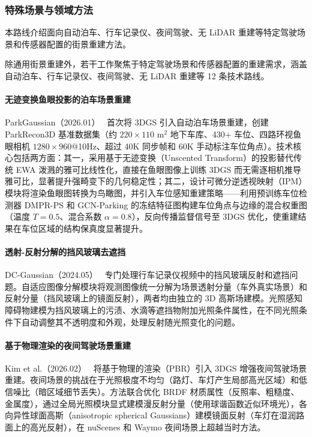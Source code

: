 \subsubsection{特殊场景与领域方法}

本路线介绍面向自动泊车、行车记录仪、夜间驾驶、无 LiDAR 重建等特定驾驶场景和传感器配置的街景重建方法。

除通用街景重建外，若干工作聚焦于特定驾驶场景和传感器配置的重建需求，涵盖自动泊车、行车记录仪、夜间驾驶、无 LiDAR 重建等 12 条技术路线。

\paragraph{无迹变换鱼眼投影的泊车场景重建}

ParkGaussian（2026.01）~\cite{2601_01386} 首次将 3DGS 引入自动泊车场景重建，创建 ParkRecon3D 基准数据集（约 $220\times110$ m$^2$ 地下车库、430+ 车位、四路环视鱼眼相机 $1280\times960$@10Hz、超过 40K 同步帧和 60K 手动标注车位角点）。技术核心包括两方面：其一，采用基于无迹变换（Unscented Transform）的投影替代传统 EWA 泼溅的雅可比线性化，直接在鱼眼图像上训练 3DGS 而无需逐相机推导雅可比，显著提升强畸变下的几何稳定性；其二，设计可微分逆透视映射（IPM）模块将渲染鱼眼图转换为鸟瞰图，并引入车位感知重建策略——利用预训练车位检测器 DMPR-PS 和 GCN-Parking 的冻结特征图构建车位角点与边缘的混合权重图（温度 $T=0.5$、混合系数 $\alpha=0.8$），反向传播监督信号至 3DGS 优化，使重建结果在车位区域的结构保真度显著提升。

\paragraph{透射-反射分解的挡风玻璃去遮挡}

DC-Gaussian（2024.05）~\cite{2405_17705} 专门处理行车记录仪视频中的挡风玻璃反射和遮挡问题。自适应图像分解模块将观测图像统一分解为场景透射分量（车外真实场景）和反射分量（挡风玻璃上的镜面反射），两者均由独立的 3D 高斯场建模。光照感知障碍物建模为挡风玻璃上的污渍、水滴等遮挡物附加光照条件属性，在不同光照条件下自动调整其不透明度和外观，处理反射随光照变化的问题。

\paragraph{基于物理渲染的夜间驾驶场景重建}

Kim et al.（2026.02）~\cite{2602_13549} 将基于物理的渲染（PBR）引入 3DGS 增强夜间驾驶场景重建。夜间场景的挑战在于光照极度不均匀（路灯、车灯产生局部高光区域）和低信噪比（暗区域细节丢失）。方法联合优化 BRDF 材质属性（反照率、粗糙度、金属度），通过全局光照模块显式建模漫反射分量（使用球谐函数近似环境光），各向异性球面高斯（anisotropic spherical Gaussians）建模镜面反射（车灯在湿润路面上的高光反射），在 nuScenes 和 Waymo 夜间场景上超越当时方法。

